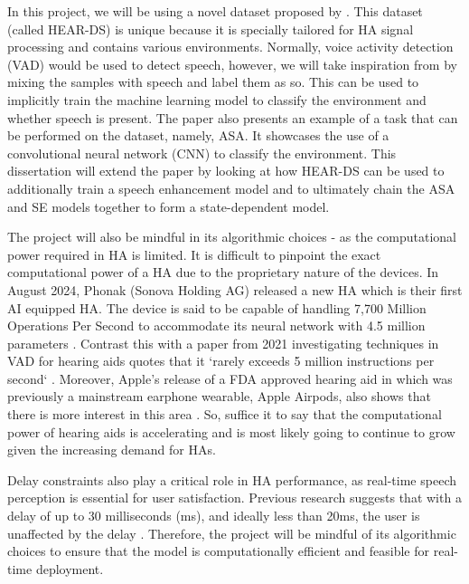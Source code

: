 \documentclass[logo,bsc,singlespacing,parskip,online]{infthesis}
\begin{document}
In this project, we will be using a novel dataset proposed by \citet{Huwel2020HearDS}.
This dataset (called HEAR-DS) is unique because it is specially tailored for HA signal processing and contains
various environments. Normally, voice activity detection (VAD) would be 
used to detect speech, however, we will take inspiration from \citet{Huwel2020HearDS}
by mixing the samples with speech and label them as so. 
This can be used to implicitly train the machine learning model to classify the environment 
and whether speech is present.
The paper also presents an example of a task that can be performed on the dataset, 
namely, ASA. It showcases the use of a convolutional neural network (CNN) to classify the environment.
This dissertation will extend the paper by looking at how HEAR-DS can be used 
to additionally train a speech enhancement model 
and to ultimately chain the ASA and SE models together to form a state-dependent model.

The project will also be mindful in its algorithmic choices - as the computational
power required in HA is limited. It is difficult to pinpoint the exact computational power of a HA
due to the proprietary nature of the devices. In August 2024,
Phonak (Sonova Holding AG) released a new HA which is their first AI 
equipped HA. The device is said to be capable of handling 7,700 Million 
Operations Per Second to accommodate its neural network with 4.5 million parameters \citep{Hasemann2024PhonakSphere}.  Contrast this with a paper 
from 2021 investigating techniques in VAD for hearing aids 
quotes that it `rarely exceeds 5 million instructions per second` \citep{Gomez2021MIPS}.
Moreover, Apple's release of a FDA approved hearing aid in which was previously a mainstream earphone wearable,
Apple Airpods, also shows that there is more interest in this area \citep{Apple2025Airpods}.
So, suffice it to say that the computational power of hearing aids is accelerating 
and is most likely going to continue to grow given the increasing demand 
for HAs.

Delay constraints also play a critical role in HA performance, as real-time speech perception is essential for user satisfaction.
Previous research suggests that with a delay of up to 30 milliseconds (ms), and ideally less than 20ms, the user
is unaffected by the delay \citep{Stone2002Delays}. Therefore, the project will be mindful of its algorithmic choices to ensure that the model
is computationally efficient and feasible for real-time deployment.
\end{document}

